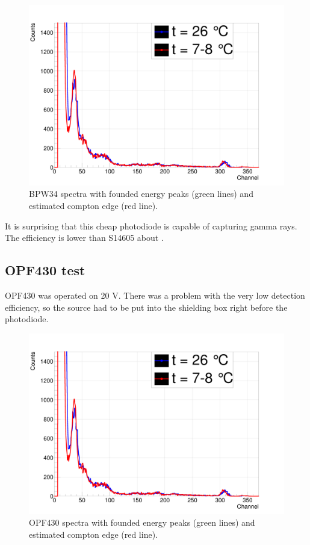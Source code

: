\begin{figure}[H]
 \centering
 \includegraphics[scale=0.13, angle = 0]{./pictures/TempDiff.png}
  \caption{BPW34 spectra with founded energy peaks (green lines) and estimated compton edge (red line).}
 \label{BPW34 spectra}
 
\end{figure}


It is surprising that this cheap photodiode is capable of capturing gamma rays. The efficiency is lower than S14605 about .
\subsection{OPF430 test}
OPF430 was operated on 20 V. There was a problem with the very low detection efficiency, so the source had to be put into the shielding box right before the photodiode.

\begin{figure}[H]
 \centering
 \includegraphics[scale=0.13, angle = 0]{./pictures/TempDiff.png}
 \caption{OPF430 spectra with founded energy peaks (green lines) and estimated compton edge (red line).}
 \label{OPF430 spectra}
 
\end{figure}

